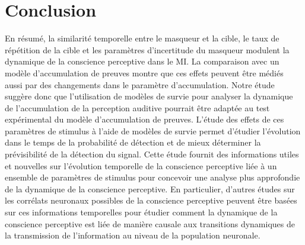 \section{Conclusion}
\label{chapitre4conclusion}

En résumé, la similarité temporelle entre le masqueur et la cible, le taux de répétition de la cible et les paramètres d'incertitude du masqueur modulent la dynamique de la conscience perceptive dans le MI. 
La comparaison avec un modèle d'accumulation de preuves montre que ces effets peuvent être médiés aussi par des changements dans le paramètre d'accumulation. 
Notre étude suggère donc que l'utilisation de modèles de survie pour analyser la dynamique de l'accumulation de la perception auditive pourrait être adaptée au test expérimental du modèle d'accumulation de preuves. 
L'étude des effets de ces paramètres de stimulus à l'aide de modèles de survie permet d'étudier l'évolution dans le temps de la probabilité de détection et de mieux déterminer la prévisibilité de la détection du signal. 
Cette étude fournit des informations utiles et nouvelles sur l'évolution temporelle de la conscience perceptive liée à un ensemble de paramètres de stimulus pour concevoir une analyse plus approfondie de la dynamique de la conscience perceptive. 
En particulier, d'autres études sur les corrélats neuronaux possibles de la conscience perceptive peuvent être basées sur ces informations temporelles pour étudier comment la dynamique de la conscience perceptive est liée de manière causale aux transitions dynamiques de la transmission de l'information au niveau de la population neuronale.

\clearpage\null\newpage
